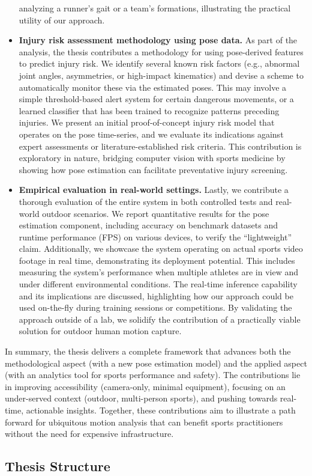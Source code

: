 \begin{itemize}
analyzing a runner’s gait or a team’s formations, illustrating the practical utility of our approach. \item \textbf{Injury risk assessment methodology using pose data.} As part of the analysis, the thesis contributes a methodology for using pose-derived features to predict injury risk. We identify several known risk factors (e.g., abnormal joint angles, asymmetries, or high-impact kinematics) and devise a scheme to automatically monitor these via the estimated poses. This may involve a simple threshold-based alert system for certain dangerous movements, or a learned classifier that has been trained to recognize patterns preceding injuries. We present an initial proof-of-concept injury risk model that operates on the pose time-series, and we evaluate its indications against expert assessments or literature-established risk criteria. This contribution is exploratory in nature, bridging computer vision with sports medicine by showing how pose estimation can facilitate preventative injury screening. \item \textbf{Empirical evaluation in real-world settings.} Lastly, we contribute a thorough evaluation of the entire system in both controlled tests and real-world outdoor scenarios. We report quantitative results for the pose estimation component, including accuracy on benchmark datasets and runtime performance (FPS) on various devices, to verify the “lightweight” claim. Additionally, we showcase the system operating on actual sports video footage in real time, demonstrating its deployment potential. This includes measuring the system’s performance when multiple athletes are in view and under different environmental conditions. The real-time inference capability and its implications are discussed, highlighting how our approach could be used on-the-fly during training sessions or competitions. By validating the approach outside of a lab, we solidify the contribution of a practically viable solution for outdoor human motion capture.
\end{itemize} In summary, the thesis delivers a complete framework that advances both the methodological aspect (with a new pose estimation model) and the applied aspect (with an analytics tool for sports performance and safety). The contributions lie in improving accessibility (camera-only, minimal equipment), focusing on an under-served context (outdoor, multi-person sports), and pushing towards real-time, actionable insights. Together, these contributions aim to illustrate a path forward for ubiquitous motion analysis that can benefit sports practitioners without the need for expensive infrastructure. \subsection{Thesis Structure}
